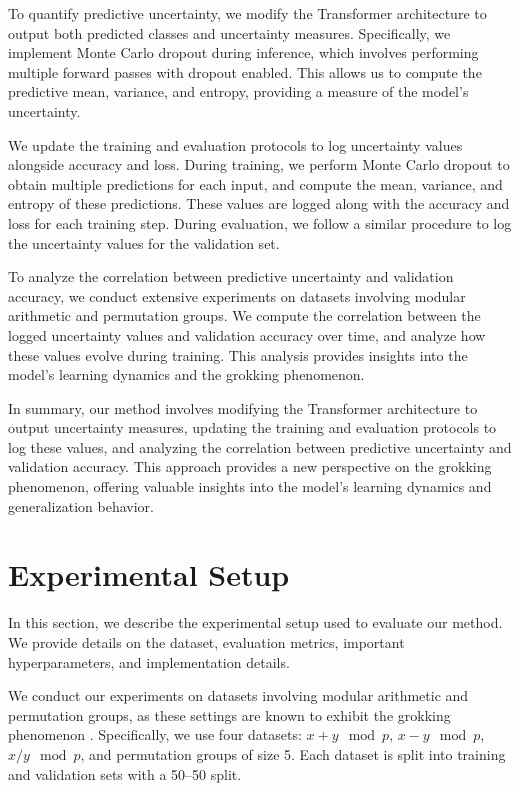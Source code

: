 \documentclass{article} %
\begin{document}
To quantify predictive uncertainty, we modify the Transformer architecture \cite{vaswani2017attention} to output both predicted classes and uncertainty measures. Specifically, we implement Monte Carlo dropout during inference, which involves performing multiple forward passes with dropout enabled. This allows us to compute the predictive mean, variance, and entropy, providing a measure of the model's uncertainty.

We update the training and evaluation protocols to log uncertainty values alongside accuracy and loss. During training, we perform Monte Carlo dropout to obtain multiple predictions for each input, and compute the mean, variance, and entropy of these predictions. These values are logged along with the accuracy and loss for each training step. During evaluation, we follow a similar procedure to log the uncertainty values for the validation set.

To analyze the correlation between predictive uncertainty and validation accuracy, we conduct extensive experiments on datasets involving modular arithmetic and permutation groups. We compute the correlation between the logged uncertainty values and validation accuracy over time, and analyze how these values evolve during training. This analysis provides insights into the model's learning dynamics and the grokking phenomenon.

In summary, our method involves modifying the Transformer architecture to output uncertainty measures, updating the training and evaluation protocols to log these values, and analyzing the correlation between predictive uncertainty and validation accuracy. This approach provides a new perspective on the grokking phenomenon, offering valuable insights into the model's learning dynamics and generalization behavior.

\section{Experimental Setup}
\label{sec:experimental}

In this section, we describe the experimental setup used to evaluate our method. We provide details on the dataset, evaluation metrics, important hyperparameters, and implementation details.

We conduct our experiments on datasets involving modular arithmetic and permutation groups, as these settings are known to exhibit the grokking phenomenon \cite{power2022grokking}. Specifically, we use four datasets: \(x + y \mod p\), \(x - y \mod p\), \(x / y \mod p\), and permutation groups of size 5. Each dataset is split into training and validation sets with a 50--50 split.
\end{document}
